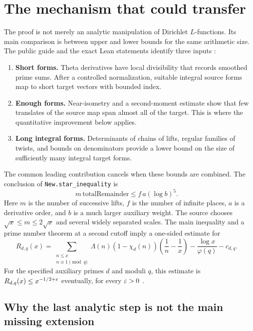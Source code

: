 \section{The mechanism that could transfer}

The proof is not merely an analytic manipulation of Dirichlet
$L$-functions. Its main comparison is between upper and lower bounds for
the same arithmetic size. The public guide and the exact Lean statements
identify three inputs \cite{guide,mainineq}:

\begin{enumerate}
\item \textbf{Short forms.} Theta derivatives have local divisibility that
records smoothed prime sums. After a controlled normalization, suitable
integral source forms map to short target vectors with bounded index.
\item \textbf{Enough forms.} Near-isometry and a second-moment estimate
show that few translates of the source map span almost all of the target.
This is where the quantitative improvement below applies.
\item \textbf{Long integral forms.} Determinants of chains of lifts,
regular families of twists, and bounds on denominators provide a lower
bound on the size of sufficiently many integral target forms.
\end{enumerate}

The common leading contribution cancels when these bounds are combined.
The conclusion of 
{\texttt{New.star\_inequality}} is
\[
 m\,\mathrm{totalRemainder}\le f\,a(\log b)^5.
\]
Here $m$ is the number of successive lifts, $f$ is the number of infinite
places, $a$ is a derivative order, and $b$ is a much larger auxiliary
weight. The source chooses $\sqrt{x}\le m\le2\sqrt{x}$ and several widely
separated scales. The main inequality and a prime number theorem at a
second cutoff imply a one-sided estimate for
\[
 R_{d,q}(x)=
 \sum_{\substack{n\le x\\n\equiv1\pmod q}}
 \Lambda(n)(1-\chi_d(n))\left(\frac1n-\frac1x\right)
 -\frac{\log x}{\varphi(q)}-c_{d,q}.
\]
For the specified auxiliary primes $d$ and moduli $q$, this estimate is
$R_{d,q}(x)\le x^{-1/2+\varepsilon}$ eventually, for every $\varepsilon>0$
\cite{onesided}.

\subsection{Why the last analytic step is not the main missing extension}

